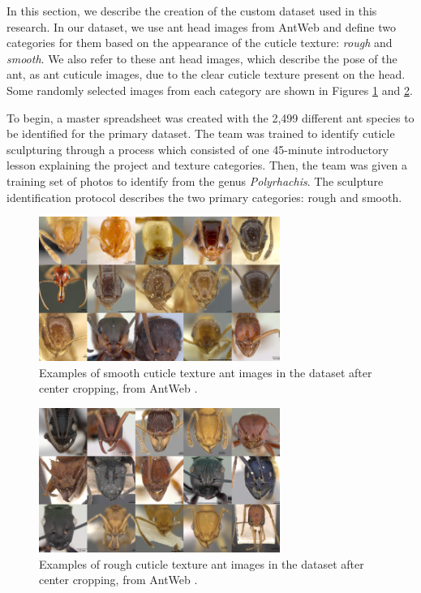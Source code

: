 \documentclass{aci}
\numberwithin{equation}{section}
\begin{document}
In this section, we describe the creation of the custom dataset used in this
research. In our dataset, we use ant head images from AntWeb
\cite{perrichot_antweb_2012} and define two categories for them based on the
appearance of the cuticle texture: \textit{rough} and \textit{smooth}. We also
refer to these ant head images, which describe the pose of the ant, as ant
cuticule images, due to the clear cuticle texture present on the head. Some
randomly selected images from each category are shown in Figures
\ref{fig:smooth-cuticle-texture} and \ref{fig:rough-cuticle-texture}.

To begin, a master spreadsheet was created with the 2,499 different ant species
to be identified for the primary dataset. The team was trained to identify
cuticle sculpturing through a process which consisted of one 45-minute
introductory lesson explaining the project and texture categories. Then, the
team was given a training set of photos to identify from the genus
\textit{Polyrhachis}. The sculpture identification protocol describes the two
primary categories: rough and smooth.

\begin{figure}
    \centering
    \includegraphics[width=0.7\textwidth]{thesis_assets/images/smooth_collage.png}
    \caption{Examples of smooth cuticle texture ant images in the dataset after
        center cropping, from AntWeb \cite{perrichot_antweb_2012}.}
    \label{fig:smooth-cuticle-texture}
\end{figure}

\begin{figure}
    \centering
    \includegraphics[width=0.7\textwidth]{thesis_assets/images/rough_collage.png}
    \caption{Examples of rough cuticle texture ant images in the dataset after
        center cropping, from AntWeb \cite{perrichot_antweb_2012}.}
    \label{fig:rough-cuticle-texture}
\end{figure}
\end{document}
